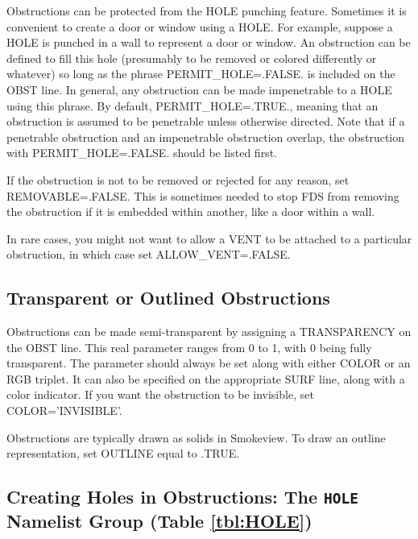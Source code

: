 \documentclass[11pt]{book}
\begin{document}
Obstructions can be protected from the {\ct HOLE} punching feature. Sometimes it is convenient to create a door or window using a {\ct HOLE}. For example, suppose a {\ct HOLE} is punched in a wall to represent a door or window. An obstruction can be defined to fill this hole (presumably to be removed or colored differently or whatever) so long as the phrase {\ct PERMIT\_HOLE=.FALSE.} is included on the {\ct OBST} line. In general, any obstruction can be made impenetrable to a {\ct HOLE} using this phrase. By default, {\ct PERMIT\_HOLE=.TRUE.}, meaning that an obstruction is assumed to be penetrable unless otherwise directed. Note that if a penetrable  obstruction and an impenetrable  obstruction overlap, the obstruction with {\ct PERMIT\_HOLE=.FALSE.} should be listed first.

If the obstruction is not to be removed or rejected for any reason, set {\ct REMOVABLE=.FALSE.} This is sometimes needed to stop
FDS from removing the obstruction if it is embedded within another, like a door within a wall.

In rare cases, you might not want to allow a {\ct VENT} to be attached to a particular obstruction, in which case set {\ct ALLOW\_VENT=.FALSE.}

\subsection{Transparent or Outlined Obstructions}

Obstructions can be made semi-transparent by assigning a {\ct TRANSPARENCY} on the {\ct OBST} line. This real parameter ranges from 0 to 1, with 0 being fully transparent. The parameter should always be set along with either {\ct COLOR} or an {\ct RGB} triplet. It can also be specified on the appropriate {\ct SURF} line, along with a color indicator. If you want the obstruction to be invisible, set {\ct COLOR='INVISIBLE'}.

Obstructions are typically drawn as solids in Smokeview. To draw an outline representation, set {\ct OUTLINE} equal to {\ct .TRUE.}



\subsection{Creating Holes in Obstructions: The \texorpdfstring{{\tt HOLE}}{HOLE} Namelist Group (Table \ref{tbl:HOLE})}
\label{info:HOLE}
\end{document}
